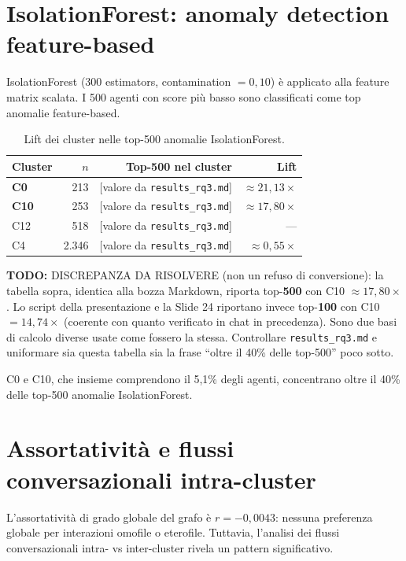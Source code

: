 \documentclass[12pt,a4paper]{report}
\newcommand{\code}[1]{\texttt{#1}}
\newcommand{\todonote}[1]{\par\noindent\colorbox{yellow!40}{\parbox{\dimexpr\linewidth-2\fboxsep}{\textbf{TODO:} #1}}\par}
\begin{document}
\section{IsolationForest: anomaly detection feature-based}

IsolationForest (300 estimators, contamination $= 0{,}10$) è applicato alla feature matrix scalata. I 500 agenti con score più basso sono classificati come top anomalie feature-based.

\begin{table}[H]
\centering
\caption{Lift dei cluster nelle top-500 anomalie IsolationForest.}
\label{tab:isolationforest-lift}
\begin{tabular}{@{}lrrr@{}}
\toprule
Cluster & $n$ & Top-500 nel cluster & Lift \\
\midrule
\textbf{C0}  & 213   & [valore da \code{results\_rq3.md}] & $\approx 21{,}13\times$ \\
\textbf{C10} & 253   & [valore da \code{results\_rq3.md}] & $\approx 17{,}80\times$ \\
C12          & 518   & [valore da \code{results\_rq3.md}] & --- \\
C4           & 2.346 & [valore da \code{results\_rq3.md}] & $\approx 0{,}55\times$ \\
\bottomrule
\end{tabular}
\end{table}

\todonote{DISCREPANZA DA RISOLVERE (non un refuso di conversione): la tabella sopra, identica alla bozza Markdown, riporta top-\textbf{500} con C10 $\approx 17{,}80\times$. Lo script della presentazione e la Slide 24 riportano invece top-\textbf{100} con C10 $= 14{,}74\times$ (coerente con quanto verificato in chat in precedenza). Sono due basi di calcolo diverse usate come fossero la stessa. Controllare \code{results\_rq3.md} e uniformare sia questa tabella sia la frase ``oltre il 40\% delle top-500'' poco sotto.}

C0 e C10, che insieme comprendono il 5,1\% degli agenti, concentrano oltre il 40\% delle top-500 anomalie IsolationForest.

\section{Assortatività e flussi conversazionali intra-cluster}

L'assortatività di grado globale del grafo è $r = -0{,}0043$: nessuna preferenza globale per interazioni omofile o eterofile. Tuttavia, l'analisi dei flussi conversazionali intra- vs inter-cluster rivela un pattern significativo.
\end{document}
